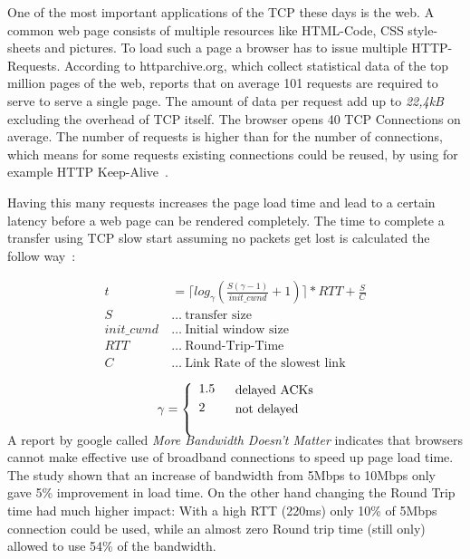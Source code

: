 One of the most important applications of the TCP these days is the web. A
common web page consists of multiple resources like HTML-Code, CSS style-sheets
and pictures. To load such a page a browser has to issue multiple HTTP-Requests.
According to httparchive.org\cite{httparchive}, which collect statistical data
of the top million pages of the web, reports that on average 101 requests are
required to serve to serve a single page\cite{httparchive-trends}. The amount of
data per request add up to \emph{22,4kB} excluding the overhead of TCP itself.
The browser opens 40 TCP Connections on average. The number of requests is
higher than for the number of connections, which means for some requests
existing connections could be reused, by using for example HTTP
Keep-Alive~\cite{I-D.thomson-hybi-http-timeout}.

Having this many requests increases the page load time and lead to a certain
latency before a web page can be rendered completely. The time to complete a
transfer using TCP slow start assuming no packets get lost is calculated the
follow way~\cite{832574}:

\begin{align}
  t&=\lceil log_{\gamma} (\frac{S(\gamma - 1)}{init\_cwnd} + 1) \rceil * RTT + \frac{S}{C} \label{loadtime}\\
  S~&\dots~\text{transfer size } \nonumber \\
  init\_cwnd~&\dots~\text{Initial window size} \nonumber \\
  RTT~&\dots~\text{Round-Trip-Time} \nonumber \\
  C~&\dots~\text{Link Rate of the slowest link} \nonumber\\
\end{align}
\begin{align}
  & && \text{delayed ACKs} \nonumber\\
  \gamma &=
    \smash{\left\{\begin{array}{lr}
       1.5 \\[\jot]
       2 \\
       \vspace{0.5em}
   \end{array}\right.} && \nonumber\text{not delayed} \\
\end{align}

A report by google called \emph{More Bandwidth Doesn't Matter}\cite{bandwith}
indicates that browsers cannot make effective use of broadband connections to
speed up page load time. The study shown that an increase of bandwidth from
5Mbps to 10Mbps only gave 5\% improvement in load time. On the other hand
changing the Round Trip time had much higher impact: With a high RTT (220ms)
only 10\% of 5Mbps connection could be used, while an almost zero Round trip
time (still only) allowed to use 54\% of the bandwidth.

